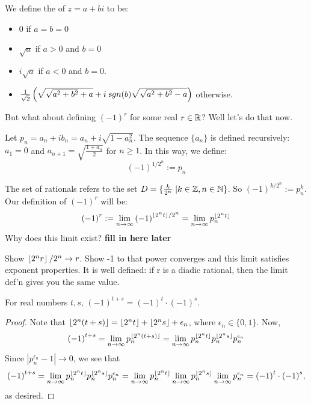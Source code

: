 \documentclass[notes]{subfile}
\begin{document}
\begin{definition}
    We define the  of $z = a+bi$ to be:
    \begin{itemize}
        \item $0$ if $a=b=0$
        \item $\sqrt{a}$ if $a>0$ and $b = 0$
        \item $i\sqrt{a}$ if $a < 0$ and $b = 0$.
        \item $\frac{1}{\sqrt{2}}\left( \sqrt{ \sqrt{a^2 + b^2} + a} 
        + i\;{\text sgn}(b) \sqrt{\sqrt{a^2+b^2}-a} \right)$ otherwise. 
    \end{itemize}
\end{definition}

But what about defining ${(-1)}^r$ for some real $r \in \operatorname{\mathbb{R}}$?
Well let's do that now.

\noindent
\begin{definition}
    Let $p_n = a_n + ib_n = a_n + i\sqrt{1 - a_n^2}$.
    The sequence $\{a_n\}$ is defined recursively: $a_1=0$ and $a_{n+1} = \sqrt{\frac{1+a_n}{2}}$ for $n \ge 1$.
    In this way, we define:
    \[ {(-1)}^{1/2^n} := p_n \]
\end{definition}

The set of  rationals refers to the set $D = \{\frac{k}{2^n} \; | k \in \operatorname{\mathbb{Z}}, n \in \operatorname{\mathbb{N}} \}$.
So ${(-1)}^{k/2^n} := p_n^k$.
Our definition of ${(-1)}^r$ will be:
\[ {(-1)}^r := \lim_{n \to \infty} {(-1)}^{\left \lfloor{2^n t}\right \rfloor/2^n} 
= \lim_{n \to \infty} p_n^{\left \lfloor{2^n t}\right \rfloor} \]
Why does this limit exist?
\textbf{fill in here later}

Show $\left \lfloor{2^n r}\right \rfloor/2^n \to r$.
Show -1 to that power converges and this limit satisfies exponent properties.
It is well defined: if r is a diadic rational, then the limit def'n gives you the same value.

\begin{theorem}
    For real numbers $t,s$, ${(-1)}^{t+s} = {(-1)}^{t}\cdot {(-1)}^{s}$.
\end{theorem}

\begin{proof}
    Note that $\left \lfloor{2^n(t+s)}\right \rfloor = \left \lfloor{2^n t}\right \rfloor + \left \lfloor{2^n s}\right \rfloor + \epsilon_n$, 
    where $\epsilon_n \in \{0,1\}$.
    Now,
    \[ {(-1)}^{t+s} = \lim_{n \to \infty} p_n^{\left \lfloor{2^n(t+s)}\right \rfloor} = \lim_{n \to \infty} p_n^{\left \lfloor{2^n t}\right \rfloor} p_n^{\left \lfloor{2^n s}\right \rfloor} p_n^{\epsilon_n} \]
    Since $|p_n^{\epsilon_n} -1| \to 0$, we see that
    \[ {(-1)}^{t+s} = \lim_{n \to \infty} p_n^{\left \lfloor{2^n t}\right \rfloor} p_n^{\left \lfloor{2^n s}\right \rfloor} p_n^{\epsilon_n} = \lim_{n \to \infty} p_n^{\left \lfloor{2^n t}\right \rfloor}  \lim_{n \to \infty} p_n^{\left \lfloor{2^n s}\right \rfloor} \lim_{n \to \infty} p_n^{\epsilon_n} = {(-1)}^{t}\cdot {(-1)}^{s}, \]
    as desired.
\end{proof}
\end{document}
